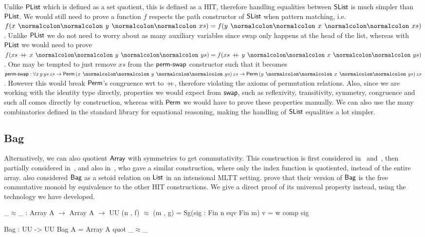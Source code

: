 Unlike $\operatorname{\mathsf{PList}}$ which is defined as a set quotient, this is defined as a HIT, therefore handling equalities
between $\operatorname{\mathsf{SList}}$ is much simpler than $\operatorname{\mathsf{PList}}$. We would still need to prove a function $f$ respects
the path constructor of $\operatorname{\mathsf{SList}}$ when pattern matching, i.e. $f(x \cons y \cons xs) = f(y \cons x \cons xs)$.
Unlike $\operatorname{\mathsf{PList}}$ we do not need to worry about as many auxiliary variables since swap
only happens at the head of the list, whereas with $\operatorname{\mathsf{PList}}$ we would need to prove
$f(xs\,\concat\,x \cons y \cons ys) = f(xs\,\concat\,y \cons x \cons ys)$. One may be tempted to just remove $xs$
from the $\operatorname{\mathsf{perm-swap}}$ constructor such that it becomes
$\term{perm-swap} : \forall x\,y\,ys\,zs \to \Perm\,(x \cons y \cons ys)\,zs \to \Perm\,(y \cons x \cons ys)\,zs$.
However this would break $\operatorname{\mathsf{Perm}}$'s congruence wrt to $\mathbin{+\kern -0.4em+}$, therefore violating the axioms of
permutation relations. Also, since we are working with the identity type directly, properties we would
expect from $\operatorname{\mathsf{swap}}$, such as reflexivity, transitivity, symmetry, congruence and such all comes directly by
construction, whereas with $\operatorname{\mathsf{Perm}}$ we would have to prove these properties manually.
We can also use the many combinatorics defined in the standard library for equational reasoning,
making the handling of $\operatorname{\mathsf{SList}}$ equalities a lot simpler.

\subsection{Bag}\label{cmon:bag}
Alternatively, we can also quotient $\operatorname{\mathsf{Array}}$ with symmetries to get commutativity.
%
This construction is first considered in~\cite{altenkirchDefinableQuotientsType2011}
and~\cite{liQuotientTypesType2015}, then partially considered in~\cite{choudhuryFreeCommutativeMonoids2023},
and also in~\cite{joramConstructiveFinalSemantics2023},
who gave a similar construction, where only the index function is quotiented, instead of
the entire array.
%
\cite{danielssonBagEquivalenceProofRelevant2012} also considered $\operatorname{\mathsf{Bag}}$ as a setoid relation
on $\operatorname{\mathsf{List}}$ in an intensional MLTT setting.
%
\cite{joramConstructiveFinalSemantics2023} prove that their version of $\operatorname{\mathsf{Bag}}$ is the free commutative monoid by
equivalence to the other HIT constructions.
%
We give a direct proof of its universal property instead, using the technology we have developed.

\begin{definition}[Bag]
    \label{def:bag}
    \leavevmode
    \begin{code}
_$\approx$_ : Array A $\to$ Array A $\to$ UU
(n , f) $\approx$ (m , g) = Sg(sig : Fin n eqv Fin m) v = w comp sig

Bag : UU -> UU
Bag A = Array A quot _$\approx$_
    \end{code}
\end{definition}

